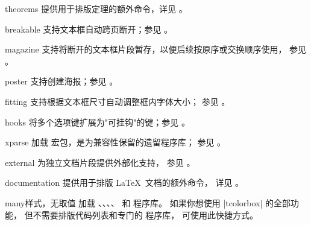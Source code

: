 \begin{docTcbKey}[library]{theorems}{}{}
  提供用于排版定理的额外命令，详见 。
\end{docTcbKey}


\begin{docTcbKey}[library]{breakable}{}{}
  支持文本框自动跨页断开；参见 。
\end{docTcbKey}

\begin{docTcbKey}[library]{magazine}{}{}
  支持将断开的文本框片段暂存，以便后续按原序或交换顺序使用，
  参见 。
\end{docTcbKey}

\begin{docTcbKey}[library]{poster}{}{}
  支持创建海报；参见 。
\end{docTcbKey}

\begin{docTcbKey}[library]{fitting}{}{}
  支持根据文本框尺寸自动调整框内字体大小；
  参见 。
\end{docTcbKey}

\begin{docTcbKey}[library]{hooks}{}{}
  将多个选项键扩展为"可挂钩"的键；参见 。
\end{docTcbKey}

\clearpage
\begin{docTcbKey}[library]{xparse}{}{}
  加载  宏包，是为兼容性保留的遗留程序库；
  参见 。
\end{docTcbKey}

\begin{docTcbKey}[library]{external}{}{}
  为独立文档片段提供外部化支持，
  参见 。
\end{docTcbKey}

\begin{docTcbKey}[library]{documentation}{}{}
  提供用于排版 \LaTeX\ 文档的额外命令，
  详见 。
\end{docTcbKey}

\begin{docTcbKey}[library]{many}{}{样式，无取值}
  加载 、、、、
   和  程序库。
  如果你想使用 |tcolorbox| 的全部功能，
  但不需要排版代码列表和专门的  程序库，
  可使用此快捷方式。
\end{docTcbKey}

